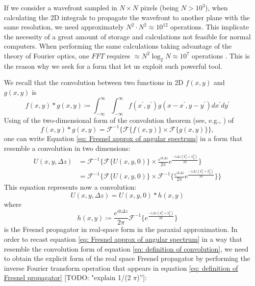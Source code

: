 \documentclass{iucr}              %
\newcommand{\todo}[1]{{\color{red}[TODO: "#1'']}}
\begin{document}
If we consider a wavefront sampled in $N \times N$ pixels (being $N > 10^3$), when calculating the 2D integrals to propagate the wavefront to another plane with the same resolution, we need approximately $N^2\cdot N^2 \approx 10^{12}$ operations. This implicate the necessity of a great amount of storage and calculations not feasible for normal computers. When performing the same calculations taking advantage of the theory of Fourier optics, one $FFT$ requires $\approx N^2 \log_2 N \approx 10^7$ operations \cite{Marshall:1992:CVM:129191}. This is the reason why we seek for a form that let us exploit such powerful tool. 

We recall that the convolution between two functions in 2D $f(x,y)$ and $g(x,y)$ is
\begin{equation}\label{eq: definition of convolution}
	f(x,y) * g(x,y) \coloneqq \int_{-\infty}^{\infty} \int_{-\infty}^{\infty} f(x^{\prime},y^{\prime})g(x-x^{\prime},y-y^{\prime})dx^{\prime}dy^{\prime}
\end{equation}
Using of the two-dimensional form of the convolution theorem (see, e.g., \cite{goodmanfourier}) of
\begin{equation}\label{eq: convolution theorem}
f(x,y) * g(x,y) = \mathcal{F}^{-1}\big\{{\mathcal{F}\{f(x,y)\} \times \mathcal{F}\{g(x,y)\}} \big\},
\end{equation}
one can write Equation \ref{eq: Fresnel approx of angular spectrum}  in a form that resemble a convolution in two dimensions:
\begin{align}\label{eq: convolution form of angular spectrum}
U(x, y, \Delta z) &= \mathcal{F}^{-1}\Big\{ \mathcal{F}\{U(x, y, 0)\} \times \frac{e^{i k \Delta z}}{2\pi} e^{\frac{-i \Delta z (k_x^2 + k_y^2) }{2k}} \Big\} \nonumber\\ 
&= \mathcal{F}^{-1}\Big\{ \mathcal{F}\{U(x, y, 0)\} \times \mathcal{F}^{-1}\Big\{  \frac{e^{i k \Delta z}}{2\pi} e^{\frac{-i \Delta z (k_x^2 + k_y^2) }{2k}} \Big \}\Big\}
\end{align} 
This equation represents now a convolution:
\begin{equation}\label{eq: short convolution form of propagation}
U(x, y, \Delta z) =U(x, y, 0) * h(x,y)
\end{equation} 
where 
\begin{equation}\label{eq: definition of Fresnel propagator}
h(x,y) \coloneqq \frac{e^{i k \Delta z}}{2\pi} \mathcal{F}^{-1}\Big \{e^{\frac{-i \Delta z (k_x^2 + k_y^2) }{2k}}\Big\}
\end{equation} 
is the Fresnel propagator in real-space form in the paraxial approximation. In order to recast equation \ref{eq: Fresnel approx of angular spectrum} in a way that resemble the convolution form of equation \ref{eq: definition of convolution}, we need to obtain the explicit form of the real space Fresnel propagator by performing the inverse Fourier transform operation that appears in equation \ref{eq: definition of Fresnel propagator} \todo{explain 1/(2 $\pi$)}:
\end{document}
